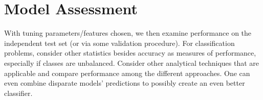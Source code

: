 \documentclass[english,nohyper,titlepage]{tufte-handout}
\begin{document}
\section{Model Assessment}
With tuning parameters/features chosen, we then examine performance on the independent test set (or via some validation procedure). For classification problems, consider other statistics besides accuracy as measures of performance, especially if classes are unbalanced. Consider other analytical techniques that are applicable and compare performance among the different approaches.  One can even combine disparate models' predictions to possibly create an even better classifier.
\end{document}
